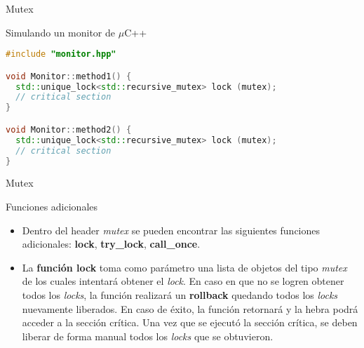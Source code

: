 \begin{frame}[fragile]{Mutex}
\begin{block}{Simulando un monitor de $\mu$C++}
\begin{lstlisting}[language=C++, basicstyle=\small]
#include "monitor.hpp"

void Monitor::method1() {
  std::unique_lock<std::recursive_mutex> lock (mutex);
  // critical section
}

void Monitor::method2() {
  std::unique_lock<std::recursive_mutex> lock (mutex);
  // critical section
}
\end{lstlisting}
\end{block}
\end{frame}


\begin{frame}{Mutex}
\begin{block}{Funciones adicionales}
\begin{itemize}
  \item Dentro del header \textit{mutex} se pueden encontrar las siguientes funciones adicionales: \textbf{lock}, \textbf{try\_lock}, \textbf{call\_once}.
  \item La \textbf{función lock} toma como parámetro una lista de objetos del tipo \textit{mutex} de los cuales intentará obtener el \textit{lock}. En caso en que no se logren obtener todos los \textit{locks}, la función realizará un \textbf{rollback} quedando todos los \textit{locks} nuevamente liberados. En caso de éxito, la función retornará y la hebra podrá acceder a la sección crítica. Una vez que se ejecutó la sección crítica, se deben liberar de forma manual todos los \textit{locks} que se obtuvieron.
\end{itemize}
\end{block}
\end{frame}

